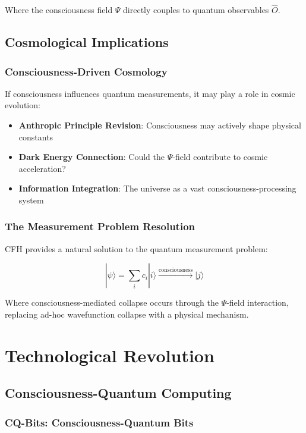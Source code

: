 \documentclass[12pt,article]{memoir}
\begin{document}
Where the consciousness field $\Psi$ directly couples to quantum observables $\hat{O}$.

\section{Cosmological Implications}

\subsection{Consciousness-Driven Cosmology}

If consciousness influences quantum measurements, it may play a role in cosmic evolution:

\begin{itemize}
    \item \textbf{Anthropic Principle Revision}: Consciousness may actively shape physical constants
    \item \textbf{Dark Energy Connection}: Could the $\Psi$-field contribute to cosmic acceleration?
    \item \textbf{Information Integration}: The universe as a vast consciousness-processing system
\end{itemize}

\subsection{The Measurement Problem Resolution}

CFH provides a natural solution to the quantum measurement problem:

\begin{equation}
|\psi\rangle = \sum_i c_i|i\rangle \xrightarrow{\text{consciousness}} |j\rangle
\end{equation}

Where consciousness-mediated collapse occurs through the $\Psi$-field interaction, replacing ad-hoc wavefunction collapse with a physical mechanism.

\chapter{Technological Revolution}

\section{Consciousness-Quantum Computing}

\subsection{CQ-Bits: Consciousness-Quantum Bits}
\end{document}
